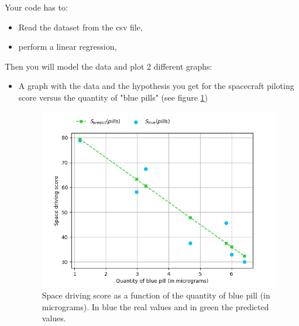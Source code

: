 \documentclass{42-en}
\begin{document}
Your code has to:
\begin{itemize}
  \item Read the dataset from the csv file,
  \item perform a linear regression, 
\end{itemize}
\newpage
Then you will model the data and plot 2 different graphs:
\begin{itemize}
  \item A graph with the data and the hypothesis you get for the spacecraft piloting score versus the quantity of "blue pills" (see figure \ref{best fit for score vs micrograms})
  \begin{figure}[!h]
    \centering
    \includegraphics[scale=0.6]{assets/ex04_score_vs_bluepills.png}
    \caption{Space driving score as a function of the quantity of blue pill (in micrograms). In blue the real values and in green the predicted values.}
    \label{best fit for score vs micrograms}
  \end{figure}
  

\end{itemize}
\end{document}
